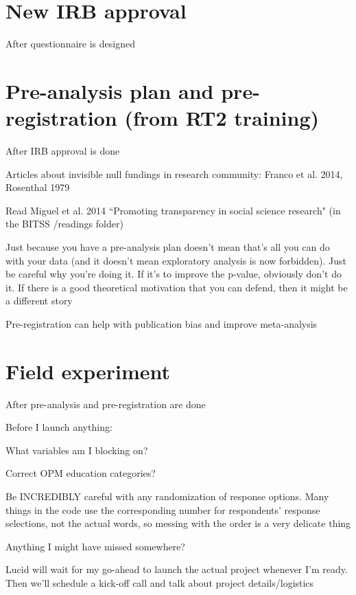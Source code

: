 \section*{New IRB approval}
	\begin{coi}
		\item After questionnaire is designed
	\end{coi}

\section*{Pre-analysis plan and pre-registration (from RT2 training)}
	\begin{coi}
		\item After IRB approval is done
		\item Articles about invisible null fundings in research community: Franco et al. 2014, Rosenthal 1979
		\item Read Miguel et al. 2014 ``Promoting transparency in social science research" (in the BITSS /readings folder)
		\item Just because you have a pre-analysis plan doesn't mean that's all you can do with your data (and it doesn't mean exploratory analysis is now forbidden). Just be careful why you're doing it. If it's to improve the p-value, obviously don't do it. If there is a good theoretical motivation that you can defend, then it might be a different story
		\item Pre-registration can help with publication bias and improve meta-analysis
	\end{coi}

\section*{Field experiment}
	\begin{coi}
		\item After pre-analysis and pre-registration are done
		\item Before I launch anything:
			\begin{coi}
				\item What variables am I blocking on?
				\item Correct OPM education categories?
				\item Be INCREDIBLY careful with any randomization of response options. Many things in the code use the corresponding number for respondents' response selections, not the actual words, so messing with the order is a very delicate thing
				\item Anything I might have missed somewhere?
			\end{coi}
		\item Lucid will wait for my go-ahead to launch the actual project whenever I'm ready. Then we'll schedule a kick-off call and talk about project details/logistics
	\end{coi}
	
